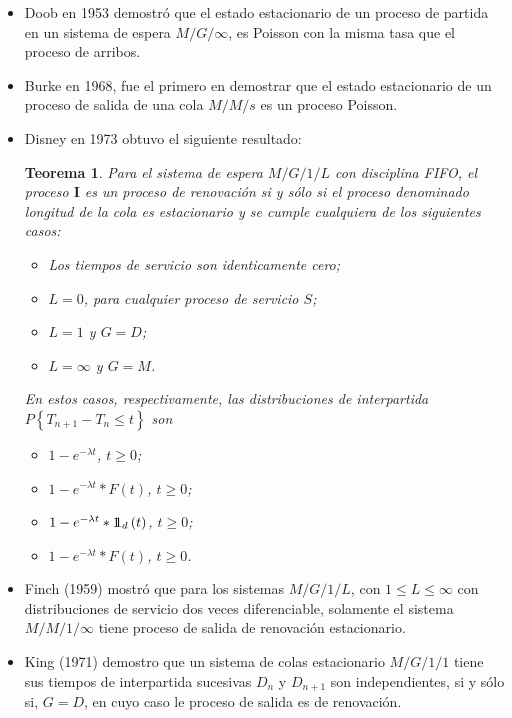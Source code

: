 \documentclass{article}
\newtheorem{Teo}{Teorema}[section]
\newcommand{\indora}{\mbox{$1$\hspace{-0.8ex}$1$}}
\numberwithin{equation}{section}
\begin{document}
\begin{itemize}
\item Doob en 1953 demostr\'o que el estado estacionario de un proceso de partida en un sistema de espera $M/G/\infty$, es Poisson con la misma tasa que el proceso de arribos.

\item Burke en 1968, fue el primero en demostrar que el estado estacionario de un proceso de salida de una cola $M/M/s$ es un proceso Poisson.

\item Disney en 1973 obtuvo el siguiente resultado:

\begin{Teo}
Para el sistema de espera $M/G/1/L$ con disciplina FIFO, el proceso $\textbf{I}$ es un proceso de renovaci\'on si y s\'olo si el proceso denominado longitud de la cola es estacionario y se cumple cualquiera de los siguientes casos:

\begin{itemize}
\item[a)] Los tiempos de servicio son identicamente cero;
\item[b)] $L=0$, para cualquier proceso de servicio $S$;
\item[c)] $L=1$ y $G=D$;
\item[d)] $L=\infty$ y $G=M$.
\end{itemize}
En estos casos, respectivamente, las distribuciones de interpartida $P\left\{T_{n+1}-T_{n}\leq t\right\}$ son


\begin{itemize}
\item[a)] $1-e^{-\lambda t}$, $t\geq0$;
\item[b)] $1-e^{-\lambda t}*F\left(t\right)$, $t\geq0$;
\item[c)] $1-e^{-\lambda t}*\indora_{d}\left(t\right)$, $t\geq0$;
\item[d)] $1-e^{-\lambda t}*F\left(t\right)$, $t\geq0$.
\end{itemize}
\end{Teo}


\item Finch (1959) mostr\'o que para los sistemas $M/G/1/L$, con $1\leq L\leq \infty$ con distribuciones de servicio dos veces diferenciable, solamente el sistema $M/M/1/\infty$ tiene proceso de salida de renovaci\'on estacionario.

\item King (1971) demostro que un sistema de colas estacionario $M/G/1/1$ tiene sus tiempos de interpartida sucesivas $D_{n}$ y $D_{n+1}$ son independientes, si y s\'olo si, $G=D$, en cuyo caso le proceso de salida es de renovaci\'on.


\end{itemize}
\end{document}
